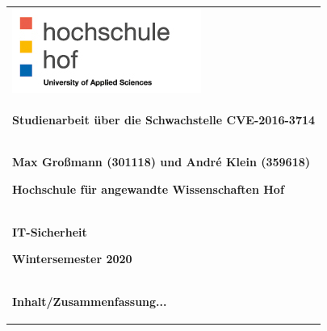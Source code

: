 \begin{center}
	\begin{tabular}{p{\textwidth}}

		\includegraphics[scale=0.75]{img/Logo.jpg}\\
		
		\begin{center}
			\textbf{Studienarbeit über die Schwachstelle CVE-2016-3714}
		\end{center}
		
		\\

		\begin{center}
			\textbf{Max Großmann (301118) und André Klein (359618)}
		\end{center}
		\begin{center}
			\textbf{Hochschule für angewandte Wissenschaften Hof}
		\end{center}

		\\

		\begin{center}
			\textbf{IT-Sicherheit}
		\end{center}
		\begin{center}
			\textbf{Wintersemester 2020}
		\end{center}

		\\

		\begin{center}
			\textbf{Inhalt/Zusammenfassung...}
		\end{center}

	\end{tabular}
\end{center}
